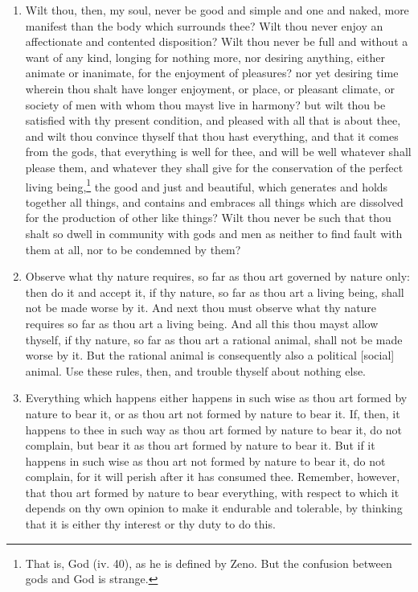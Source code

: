 \begin{enumerate}
\item Wilt thou, then, my soul, never be good and simple and one and naked, more manifest than the body which surrounds thee? Wilt thou never enjoy an affectionate and contented disposition? Wilt thou never be full and without a want of any kind, longing for nothing more, nor desiring anything, either animate or inanimate, for the enjoyment of pleasures? nor yet desiring time wherein thou shalt have longer enjoyment, or place, or pleasant climate, or society of men with whom thou mayst live in harmony? but wilt thou be satisfied with thy present condition, and pleased with all that is about thee, and wilt thou convince thyself that thou hast everything, and that it comes from the gods, that everything is well for thee, and will be well whatever shall please them, and whatever they shall give for the conservation of the perfect living being,\footnote{That is, God (iv. 40), as he is defined by Zeno. But the confusion between gods and God is strange.} the good and just and beautiful, which generates and holds together all things, and contains and embraces all things which are dissolved for the production of other like things? Wilt thou never be such that thou shalt so dwell in community with gods and men as neither to find fault with them at all, nor to be condemned by them?

\item Observe what thy nature requires, so far as thou art governed by nature only: then do it and accept it, if thy nature, so far as thou art a living being, shall not be made worse by it. And next thou must observe what thy nature requires so far as thou art a living being. And all this thou mayst allow thyself, if thy nature, so far as thou art a rational animal, shall not be made worse by it. But the rational animal is consequently also a political [{\clarify social}] animal. Use these rules, then, and trouble thyself about nothing else.

\item Everything which happens either happens in such wise as thou art formed by nature to bear it, or as thou art not formed by nature to bear it. If, then, it happens to thee in such way as thou art formed by nature to bear it, do not complain, but bear it as thou art formed by nature to bear it. But if it happens in such wise as thou art not formed by nature to bear it, do not complain, for it will perish after it has consumed thee. Remember, however, that thou art formed by nature to bear everything, with respect to which it depends on thy own opinion to make it endurable and tolerable, by thinking that it is either thy interest or thy duty to do this.


\end{enumerate}
